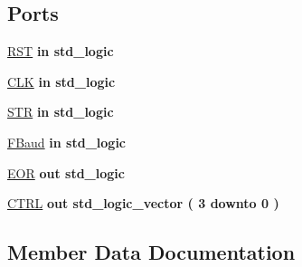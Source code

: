 \subsection*{Ports}
 \begin{DoxyCompactItemize}
\item 
\hyperlink{class_fsm_read_a98682ef7de2714e5bab788a2e2ff1b7f}{R\+S\+T}  {\bfseries {\bfseries \textcolor{keywordflow}{in}\textcolor{vhdlchar}{ }}} {\bfseries \textcolor{comment}{std\+\_\+logic}\textcolor{vhdlchar}{ }} 
\item 
\hyperlink{class_fsm_read_ab5d0ea9e968d49d94da9db07a979d402}{C\+L\+K}  {\bfseries {\bfseries \textcolor{keywordflow}{in}\textcolor{vhdlchar}{ }}} {\bfseries \textcolor{comment}{std\+\_\+logic}\textcolor{vhdlchar}{ }} 
\item 
\hyperlink{class_fsm_read_a2362aafea593a78b601ede05bb71edd7}{S\+T\+R}  {\bfseries {\bfseries \textcolor{keywordflow}{in}\textcolor{vhdlchar}{ }}} {\bfseries \textcolor{comment}{std\+\_\+logic}\textcolor{vhdlchar}{ }} 
\item 
\hyperlink{class_fsm_read_af29ebfe43178ab3fe4bfeb0538c18d1f}{F\+Baud}  {\bfseries {\bfseries \textcolor{keywordflow}{in}\textcolor{vhdlchar}{ }}} {\bfseries \textcolor{comment}{std\+\_\+logic}\textcolor{vhdlchar}{ }} 
\item 
\hyperlink{class_fsm_read_aa72e26c017c5c6834391eb61646184e0}{E\+O\+R}  {\bfseries {\bfseries \textcolor{keywordflow}{out}\textcolor{vhdlchar}{ }}} {\bfseries \textcolor{comment}{std\+\_\+logic}\textcolor{vhdlchar}{ }} 
\item 
\hyperlink{class_fsm_read_a9473d2919b00675480ada51bb608f6c3}{C\+T\+R\+L}  {\bfseries {\bfseries \textcolor{keywordflow}{out}\textcolor{vhdlchar}{ }}} {\bfseries \textcolor{comment}{std\+\_\+logic\+\_\+vector}\textcolor{vhdlchar}{ }\textcolor{vhdlchar}{(}\textcolor{vhdlchar}{ }\textcolor{vhdlchar}{ } \textcolor{vhdldigit}{3} \textcolor{vhdlchar}{ }\textcolor{keywordflow}{downto}\textcolor{vhdlchar}{ }\textcolor{vhdlchar}{ } \textcolor{vhdldigit}{0} \textcolor{vhdlchar}{ }\textcolor{vhdlchar}{)}\textcolor{vhdlchar}{ }} 
\end{DoxyCompactItemize}


\subsection{Member Data Documentation}
\hypertarget{class_fsm_read_ab5d0ea9e968d49d94da9db07a979d402}{}
